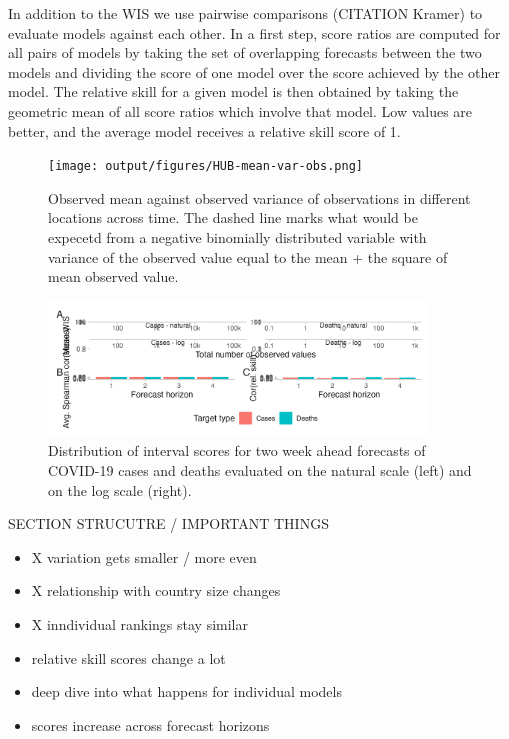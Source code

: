 \documentclass{article}
\begin{document}
In addition to the WIS we use pairwise comparisons (CITATION Kramer) to evaluate models against each other. In a first step, score ratios are computed for all pairs of models by taking the set of overlapping forecasts between the two models and dividing the score of one model over the score achieved by the other model. The relative skill for a given model is then obtained by taking the geometric mean of all score ratios which involve that model. Low values are better, and the average model receives a relative skill score of 1. 

\begin{figure}[h!]
    \centering
    \texttt{[image: output/figures/HUB-mean-var-obs.png]}
    \caption{Observed mean against observed variance of observations in different locations across time. The dashed line marks what would be expecetd from a negative binomially distributed variable with variance of the observed value equal to the mean + the square of mean observed value. }
    \label{fig:HUB-variance-mean}
\end{figure}

\begin{figure}[h!]
    \centering
    \includegraphics[width=0.9\textwidth]{output/figures/HUB-average-scores.png}
    \caption{Distribution of interval scores for two week ahead forecasts of COVID-19 cases and deaths evaluated on the natural scale (left) and on the log scale (right). }
    \label{fig:HUB-average-scores}
\end{figure}


SECTION STRUCUTRE / IMPORTANT THINGS
\begin{itemize}
\item X variation gets smaller / more even
\item X relationship with country size changes
\item X inndividual rankings stay similar
\item relative skill scores change a lot
\item deep dive into what happens for individual models
\item scores increase across forecast horizons
\end{itemize}
\end{document}

